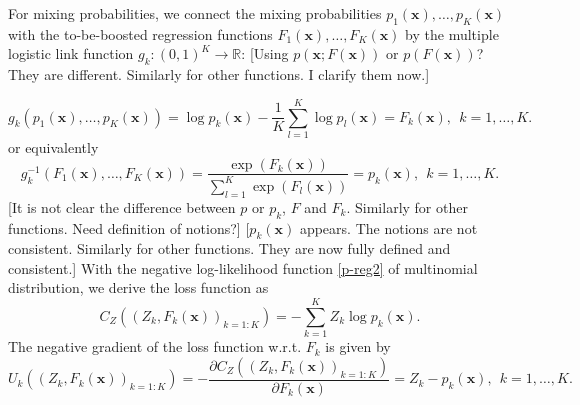 \documentclass[11pt]{article}
\numberwithin{equation}{section}
\def\R{{\mathbb R}}  %
\def\bx{\boldsymbol{x}}
\begin{document}
For mixing probabilities, we connect the mixing probabilities $p_1(\bx),\ldots,p_K(\bx)$ with the to-be-boosted regression functions $F_1(\bx),\ldots,F_K(\bx)$ by the multiple logistic link function $g_k:(0,1)^K\rightarrow \R$: {\color{blue}[Using $p(\bx;F(\bx))$ or $p(F(\bx))$? They are different. Similarly for other functions. I clarify them now.]}
	
	\begin{equation}\label{inv-logistic}
		g_k(p_1(\bx),\ldots,p_K(\bx))=\log p_k(\bx)-\frac{1}{K}\sum_{l=1}^K\log p_l(\bx)=F_k(\bx),~~k=1,\ldots,K.
\end{equation}
or equivalently
	\begin{equation}\label{logistic}
	g_k^{-1}(F_1(\bx),\ldots,F_K(\bx))=\frac{\exp\left(F_k(\bx)\right)}{\sum_{l=1}^{K}\exp\left(F_l(\bx)\right)}=	p_k(\bx),~~k=1,\ldots,K.
	\end{equation}
	 {\color{blue}[It is not clear the difference between $p$ or $p_k$, $F$ and $F_k$. Similarly for other functions. Need definition of notions?]}
{\color{blue}[$p_k(\bx)$ appears. The notions are not consistent. Similarly for other functions. They are now fully defined and consistent.]}
With the negative log-likelihood function \eqref{p-reg2} of multinomial distribution, we derive the loss function as
\begin{equation}\label{p-loss}
		{C_{Z}\left((Z_k, F_k(\bx))_{k=1:K}\right)}= - \sum_{k=1}^K Z_k \log p_k(\bx).
\end{equation}
The negative gradient of the loss function w.r.t. $F_k$ is given by
\begin{equation}\label{p-gradient}
	{U_k\left((Z_k, F_k(\bx))_{k=1:K}\right)}=-\frac{\partial C_{Z}\left((Z_k, F_k(\bx))_{k=1:K}\right)}{\partial F_k(\bx)}=
	Z_k-p_k(\bx), ~~k=1,\ldots,K.
\end{equation}
\end{document}
